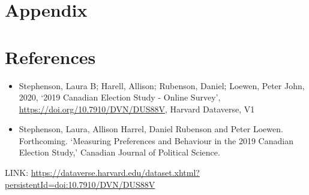 \documentclass[
  12pt,
]{article}
\begin{document}
\pagebreak

\hypertarget{appendix}{%
\section{Appendix}\label{appendix}}

\pagebreak

\hypertarget{references}{%
\section{References}\label{references}}

\begin{itemize}
\item
  Stephenson, Laura B; Harell, Allison; Rubenson, Daniel; Loewen, Peter
  John, 2020, `2019 Canadian Election Study - Online Survey',
  \url{https://doi.org/10.7910/DVN/DUS88V}, Harvard Dataverse, V1
\item
  Stephenson, Laura, Allison Harrel, Daniel Rubenson and Peter Loewen.
  Forthcoming. `Measuring Preferences and Behaviour in the 2019 Canadian
  Election Study,' Canadian Journal of Political Science.
\end{itemize}

LINK:
\url{https://dataverse.harvard.edu/dataset.xhtml?persistentId=doi:10.7910/DVN/DUS88V}
\end{document}
